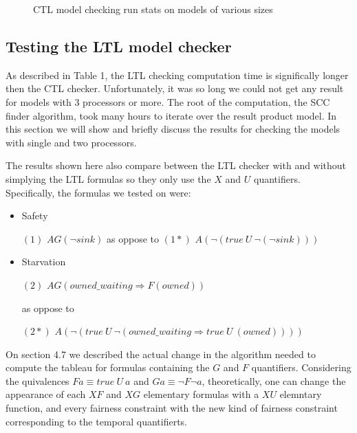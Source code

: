 \documentclass[11pt]{article}
\begin{document}
\begin{figure}
        \caption{CTL model checking run stats on models of various sizes} \label{fig:3}
        \end{figure}

    \subsection{Testing the LTL model checker}
        As described in Table 1, the LTL checking computation time is significally longer then the CTL checker. Unfortunately, it
        was so long we could not get any result for models with 3 processors or more. The root of the computation, the SCC finder algorithm,
        took many hours to iterate over the result product model. In this section we will show and briefly discuss the results
        for checking the models with single and two processors.

        The results shown here also compare between the LTL checker with and without simplying the LTL formulas so they only use the $X$ and $U$
        quantifiers. Specifically, the formulas we tested on were:

        \begin{itemize}
            \item Safety
            
            $(1)$ $AG(\lnot sink)$ as oppose to $(1*)$ $A(\lnot (true\ U\ \lnot(\lnot sink)))$

            \item Starvation 
            
            $(2)$ $AG(owned\_waiting \Rightarrow F(owned))$ 
            
            as oppose to 
            
            $(2*)$ $A(\lnot (true\ U\ \lnot(owned\_waiting \Rightarrow true\ U\ (owned))))$
        \end{itemize}

        On section 4.7 we described the actual change in the algorithm needed to compute the tableau for formulas containing the $G$ and $F$
        quantifiers. Considering the quivalences $Fa \equiv true\ U\ a$ and $Ga \equiv \lnot F \lnot a$, theoretically, one can change the appearance
        of each $XF$ and $XG$ elementary formulas with a $XU$ elemntary function, and every fairness constraint with the new kind of fairness constraint
        corresponding to the temporal quantifierts.
\end{document}
